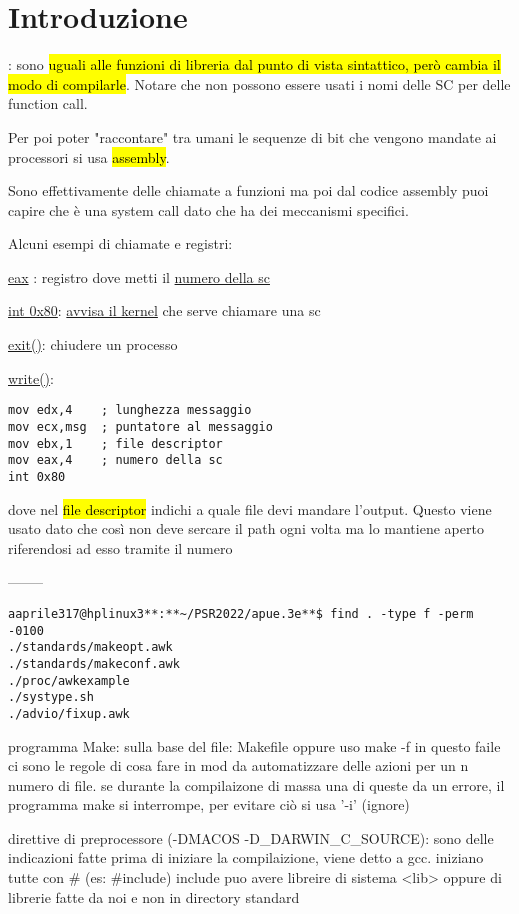 
\section{Introduzione}

: sono \hl{uguali alle funzioni di libreria dal punto di vista sintattico, però cambia il modo di compilarle}. Notare che non possono essere usati i nomi delle SC per delle function call.

Per poi poter "raccontare" tra umani le sequenze di bit che vengono mandate ai processori si usa \hl{assembly}.

Sono effettivamente delle chiamate a funzioni ma poi dal codice assembly puoi capire che è una system call dato che ha dei meccanismi specifici.

Alcuni esempi di chiamate e registri:
\itemize{}
	\item \underline{eax} : registro dove metti il \underline{numero della sc}
	\item \underline{int 0x80}: \underline{avvisa il kernel} che serve chiamare una sc
	\item \underline{exit()}: chiudere un processo
	\item \underline{write()}:

\begin{lstlisting}
mov edx,4    ; lunghezza messaggio
mov ecx,msg  ; puntatore al messaggio
mov ebx,1    ; file descriptor
mov eax,4    ; numero della sc
int 0x80	
\end{lstlisting}

dove nel \hl{file descriptor} indichi a quale file devi mandare l'output. Questo viene usato dato che così non deve sercare il path ogni volta ma lo mantiene aperto riferendosi ad esso tramite il numero




--------
\begin{lstlisting}
aaprile317@hplinux3**:**~/PSR2022/apue.3e**$ find . -type f -perm -0100
./standards/makeopt.awk
./standards/makeconf.awk
./proc/awkexample
./systype.sh
./advio/fixup.awk
\end{lstlisting}

programma Make: sulla base del file: Makefile oppure uso make -f in questo faile ci sono le regole di cosa fare in mod da automatizzare delle azioni per un n numero di file. se durante la compilaizone di massa una di queste da un errore, il programma make si interrompe, per evitare ciò si usa '-i' (ignore)

direttive di preprocessore (-DMACOS -D_DARWIN_C_SOURCE): sono delle indicazioni fatte prima di iniziare la compilaizione, viene detto a gcc. iniziano tutte con # (es: #include) include puo avere libreire di sistema <lib> oppure di librerie fatte da noi e non in directory standard

